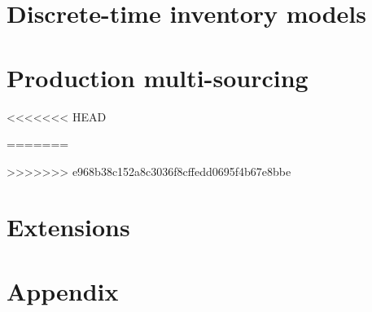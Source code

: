 
\cleardoublepage
\part{Discrete-time inventory models}
\label{part:production planning}





\cleardoublepage
\part{Production multi-sourcing}
\label{part:multi-sourcing}

<<<<<<< HEAD


=======
 
 
>>>>>>> e968b38c152a8c3036f8cffedd0695f4b67e8bbe


\cleardoublepage
\part{Extensions}
\label{part:extensions}


 


\cleardoublepage
{}







\cleardoublepage
{}






\appendix


\cleardoublepage

\part*{Appendix}
\label{part:appendix}






